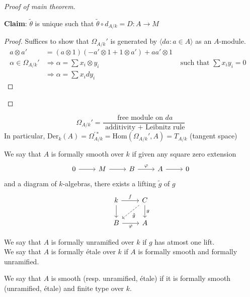 \documentclass[oneside, 12pt]{scrbook}
\newcommand{\Hom}{\mathrm{Hom}}
\theoremstyle{theorem}
\begin{document}
\begin{proof}[Proof of main theorem]
\begin{enumerate}
\textbf{Claim}:  $\tilde{\theta}$ is unique such that $\tilde{\theta} \circ d_{A/k} = D : A \rightarrow M$
\begin{proof}
Suffices to show that $\Omega_{A/k}'$ is generated by $\langle da : a \in A \rangle$ as an $A$-module. 
\begin{align*}
a\otimes a' &= (a \otimes 1)(-a' \otimes 1 + 1 \otimes a') + aa' \otimes 1 & &\\
\alpha \in \Omega_{A/k}' &\Rightarrow \alpha = \sum x_{i} \otimes y_{i} &\text{ such that } \sum x_{i}y_{i} = 0 \\
&\Rightarrow \alpha = \sum x_{i}dy_{i}
\end{align*}
\end{proof}
\end{enumerate}
\end{proof}

\begin{corollary}
$$\Omega_{A/k}' = \frac{\text{ free module on } da}{\text{ additivity + Leibnitz rule}}$$
In particular, $\mathrm{Der}_{k}(A) = \Omega_{A/k}^{'*} = \Hom(\Omega_{A/k}',A) = T_{A/k}$ (tangent space)
\end{corollary}


\begin{definition}
We say that $A$ is formally smooth over $k$ if given any square zero extension \[\begin{tikzcd}
	0 & M & B & A & 0
	\arrow[from=1-1, to=1-2]
	\arrow[from=1-2, to=1-3]
	\arrow["\varphi", from=1-3, to=1-4]
	\arrow[from=1-4, to=1-5]
\end{tikzcd}\] and a diagram of $k$-algebras, there exists a lifting $\tilde{g}$ of $g$ 
\[\begin{tikzcd}
	k & C \\
	B & A
	\arrow[from=1-1, to=2-1]
	\arrow["f", from=1-1, to=1-2]
	\arrow["\varphi"', from=2-1, to=2-2]
	\arrow["g", from=1-2, to=2-2]
	\arrow["{\tilde{g}}", dashed, from=1-2, to=2-1]
\end{tikzcd}\]
\end{definition}

\begin{definition}
We say that $A$ is formally unramified over $k$ if $g$ has atmost one lift. \\
We say that $A$ is formally \'{e}tale over $k$ if $A$ is formally smooth and formally unramified.
\end{definition}

\begin{definition}
We say that $A$ is smooth (resp. unramified, \'{e}tale) if it is formally smooth (unramified, \'{e}tale) and finite type over $k$.
\end{definition}
\end{document}
